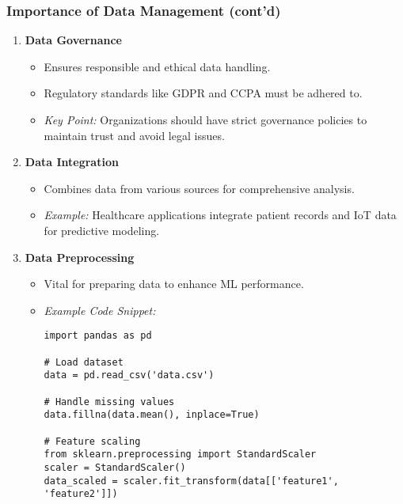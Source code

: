 \documentclass{beamer}
\begin{document}
\begin{frame}[fragile]
    \frametitle{Importance of Data Management (cont'd)}
    \begin{enumerate}[resume]
        \item \textbf{Data Governance}
        \begin{itemize}
            \item Ensures responsible and ethical data handling.
            \item Regulatory standards like GDPR and CCPA must be adhered to.
            \item \textit{Key Point:} Organizations should have strict governance policies to maintain trust and avoid legal issues.
        \end{itemize}

        \item \textbf{Data Integration}
        \begin{itemize}
            \item Combines data from various sources for comprehensive analysis.
            \item \textit{Example:} Healthcare applications integrate patient records and IoT data for predictive modeling.
        \end{itemize}
        
        \item \textbf{Data Preprocessing}
        \begin{itemize}
            \item Vital for preparing data to enhance ML performance.
            \item \textit{Example Code Snippet:}
            \begin{lstlisting}
import pandas as pd

# Load dataset
data = pd.read_csv('data.csv')

# Handle missing values
data.fillna(data.mean(), inplace=True)

# Feature scaling
from sklearn.preprocessing import StandardScaler
scaler = StandardScaler()
data_scaled = scaler.fit_transform(data[['feature1', 'feature2']])
            \end{lstlisting}
        \end{itemize}
    \end{enumerate}
\end{frame}
\end{document}
